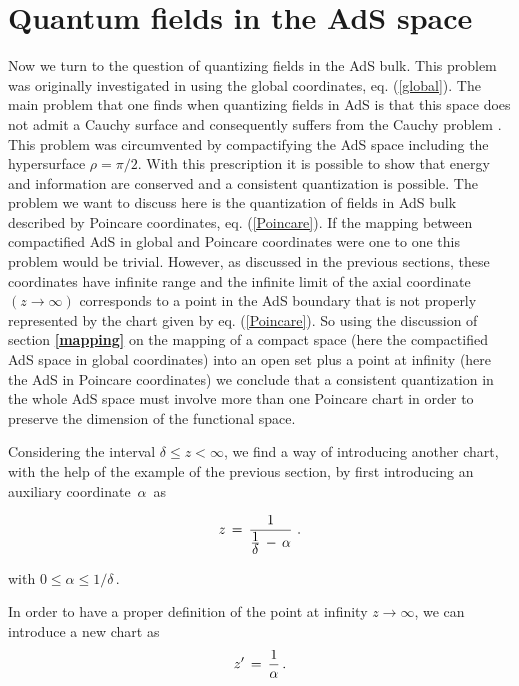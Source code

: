\documentclass[a4paper,12pt]{article}
\begin{document}
\bigskip

\section{Quantum fields in the AdS space}

\bigskip
 
Now we turn to the question of quantizing fields in the AdS bulk.
This problem was originally investigated in \cite{QAdS1,QAdS2}
using the global coordinates, eq. (\ref{global}).
The main problem that one finds when quantizing fields in AdS is that
this space does not admit a Cauchy surface and consequently suffers from
the Cauchy problem \cite{HE}. This problem  was  circumvented by
compactifying the AdS space including the hypersurface $\rho=\pi/2$.
With this prescription it is possible to show that energy and information
are conserved and a consistent quantization is possible.
The problem we want to discuss here is the quantization of fields in AdS
bulk described by Poincare coordinates, eq. (\ref{Poincare}).
If the mapping between compactified AdS in global and Poincare coordinates
were one to one this problem would be trivial. However, as discussed in
the previous sections, these coordinates have infinite
range and  the infinite limit of the axial coordinate 
$(z\to\infty)$ corresponds to a point in the AdS boundary that is not 
properly represented by the chart given by eq. (\ref{Poincare}). 
So using the discussion of section {\bf \ref{mapping}} on the mapping 
of a compact
space (here the compactified AdS space in global coordinates) 
into an open set plus a point
at infinity (here the AdS in Poincare coordinates) we conclude that 
a consistent quantization in the whole 
AdS space must involve more than one Poincare chart in order to preserve
the dimension of the functional space. 

Considering the interval $\delta \le z < \infty$, 
we find a way of introducing another chart, with the help of 
the example of the previous section, by first introducing an auxiliary 
coordinate $\,\alpha \,$ as

\begin{equation}
\label{z}
z \,=\, {1\over {\textstyle 1\over\textstyle\delta} \,-\,\alpha}\,\,.
\end{equation}

\noindent with $ 0 \le \alpha \le  1/\delta \,$. 



In order to have a proper definition
of the point at infinity $z\to\infty$, we can introduce a new chart as 
\begin{equation}
z^\prime \,=\, {1\over \alpha }\,.
\end{equation}
\end{document}
